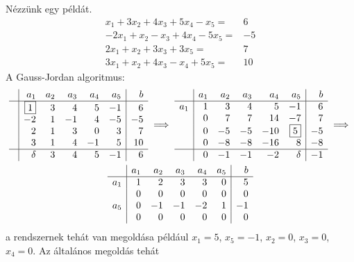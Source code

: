 \documentclass[9pt, a4paper, showtrims]{memoir}
\theoremstyle{plain}
\theoremstyle{remark}
\theoremstyle{definition}
\begin{document}
Nézzünk egy példát.
\[
    \begin{array}{rl}
        x_1+3x_2+4x_3+5x_4-x_5=&6  \\
        -2x_1+x_2-x_3+4x_4-5x_5=&-5  \\
        2x_1+x_2+3x_3+3x_5=&7  \\
        3x_1+x_2+4x_3-x_4+5x_5=&10 
    \end{array}
\]
A Gauss-Jordan algoritmus: 
\begin{multline*}
    \begin{array}{c|rrrrr|r}
        &a_1&a_2&a_3&a_4&a_5&b\\
        \hline
        &\boxed{1}&3&4&5&-1&6\\
        &-2&1&-1&4&-5&-5\\
        &2&1&3&0&3&7\\
        &3&1&4&-1&5&10\\
        \hline
        &\delta&3&4&5&-1&6
    \end{array}
    \implies
    \begin{array}{c|rrrrr|r}
        &a_1&a_2&a_3&a_4&a_5&b\\
        \hline
        a_1&1&3&4&5&-1&6\\
        &0&7&7&14&-7&7\\
        &0&-5&-5&-10&\boxed{5}&-5\\
        &0&-8&-8&-16&8&-8\\
        \hline
        &0&-1&-1&-2&\delta&-1
    \end{array}
    \implies
    \\
    \begin{array}{c|rrrrr|r}
        &a_1&a_2&a_3&a_4&a_5&b\\
        \hline
        a_1&1&2&3&3&0&5\\
        &0&0&0&0&0&0\\
        a_5&0&-1&-1&-2&1&-1\\
        &0&0&0&0&0&0\\
    \end{array}
\end{multline*}
a rendszernek tehát van megoldása például $x_1=5$, $x_5=-1$, $x_2=0$, $x_3=0$, $x_4=0$.
Az általános megoldás tehát
\end{document}
